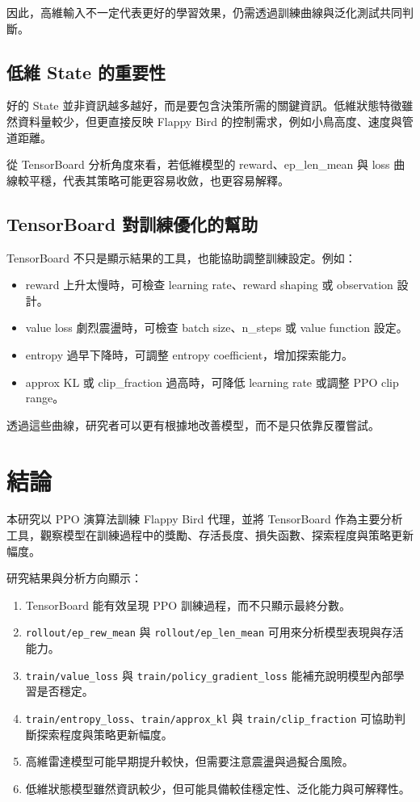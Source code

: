 \documentclass[12pt,a4paper]{ctexart}
\begin{document}
因此，高維輸入不一定代表更好的學習效果，仍需透過訓練曲線與泛化測試共同判斷。

\subsection{低維 State 的重要性}

好的 State 並非資訊越多越好，而是要包含決策所需的關鍵資訊。低維狀態特徵雖然資料量較少，但更直接反映 Flappy Bird 的控制需求，例如小鳥高度、速度與管道距離。

從 TensorBoard 分析角度來看，若低維模型的 reward、ep\_len\_mean 與 loss 曲線較平穩，代表其策略可能更容易收斂，也更容易解釋。

\subsection{TensorBoard 對訓練優化的幫助}

TensorBoard 不只是顯示結果的工具，也能協助調整訓練設定。例如：

\begin{itemize}
  \item reward 上升太慢時，可檢查 learning rate、reward shaping 或 observation 設計。
  \item value loss 劇烈震盪時，可檢查 batch size、n\_steps 或 value function 設定。
  \item entropy 過早下降時，可調整 entropy coefficient，增加探索能力。
  \item approx KL 或 clip\_fraction 過高時，可降低 learning rate 或調整 PPO clip range。
\end{itemize}

透過這些曲線，研究者可以更有根據地改善模型，而不是只依靠反覆嘗試。

\section{結論}

本研究以 PPO 演算法訓練 Flappy Bird 代理，並將 TensorBoard 作為主要分析工具，觀察模型在訓練過程中的獎勵、存活長度、損失函數、探索程度與策略更新幅度。

研究結果與分析方向顯示：

\begin{enumerate}
  \item TensorBoard 能有效呈現 PPO 訓練過程，而不只顯示最終分數。
  \item \texttt{rollout/ep\_rew\_mean} 與 \texttt{rollout/ep\_len\_mean} 可用來分析模型表現與存活能力。
  \item \texttt{train/value\_loss} 與 \texttt{train/policy\_gradient\_loss} 能補充說明模型內部學習是否穩定。
  \item \texttt{train/entropy\_loss}、\texttt{train/approx\_kl} 與 \texttt{train/clip\_fraction} 可協助判斷探索程度與策略更新幅度。
  \item 高維雷達模型可能早期提升較快，但需要注意震盪與過擬合風險。
  \item 低維狀態模型雖然資訊較少，但可能具備較佳穩定性、泛化能力與可解釋性。
\end{enumerate}
\end{document}

